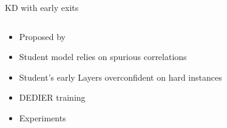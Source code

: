 \documentclass[aspectratio=169,xcolor=dvipsnames]{beamer}
\begin{document}
\begin{frame}{KD with early exits}
    \begin{columns}
        \begin{column}{0.3\textwidth}
            \begin{itemize}
                \item<1-> Proposed by \cite{tiwari_using_2024} %
                \item<2-> Student model relies on spurious correlations
                \item<3-> Student's early Layers overconfident on hard instances
                \item<4-> DEDIER training
                \item<5-> Experiments
            \end{itemize}
        \end{column}


\end{columns}
\end{frame}
\end{document}
